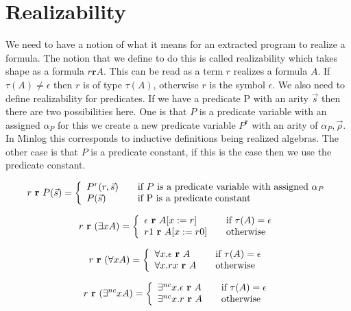 \section{Realizability}\label{sec:realizability}
We need to have a notion of what it means for an extracted program to realize
a formula. The notion that we define to do this is called realizability which takes shape as a formula $r \textbf{r} A$. This can be read as
a term $r$ realizes a formula $A$. If $\tau(A) \neq \epsilon$ then $r$ is of type $\tau (A)$,
otherwise $r$ is the symbol $\epsilon$. We also need to define realizability
for predicates. If we have a predicate P
with an arity $\vec{s}$ then there are two possibilities here. One is that
$P$ is a predicate variable with an assigned $\alpha_P$ for this we create a new
predicate variable $P^{\textbf{r}}$ with an arity of $\alpha_P,\vec{\rho}$. In Minlog this corresponds to inductive definitions being realized algebras.
The other case is that $P$ is a predicate constant, if this is the case then
we use the predicate constant.



\[ r \ \textbf{r} \ P(\vec{s}) = \left\{ 
\begin{array}{l l}
P^r(r,\vec{s}) & \quad \text{if $P$ is a predicate variable with assigned $\alpha_P$} \\ 
P(\vec{s}) & \quad \text{if P is a predicate constant} \\

\end{array} \right.
\]

\[ r \ \textbf{r} \ (\exists x A) = \left\{ 
\begin{array}{l l}
\epsilon \ \textbf{r} \ A[x:=r] & \quad \text{if $\tau (A) = \epsilon$} \\ 
r1 \ \textbf{r} \ A[x:= r0] & \quad \text{otherwise} \\

\end{array} \right.
\]

\[ r \ \textbf{r} \ (\forall x A) = \left\{ 
\begin{array}{l l}
\forall x. \epsilon \ \textbf{r} \ A & \quad \text{if $\tau (A) = \epsilon$} \\ 
\forall x. rx \ \textbf{r} \ A & \quad \text{otherwise} \\

\end{array} \right.
\]


\[ r \ \textbf{r} \ (\exists^{nc} x A) = \left\{ 
\begin{array}{l l}
\exists^{nc} x. \epsilon \ \textbf{r} \ A & \quad \text{if $\tau (A) = \epsilon$} \\ 
\exists^{nc} x. r \ \textbf{r} \ A & \quad \text{otherwise} \\

\end{array} \right.
\]


